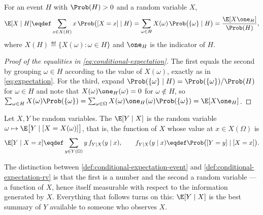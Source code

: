 \begin{definition}\label{def:conditional-expectation-event}
	For an event $H$ with $\Prob(H)>0$ and a random variable $X$,
	\begin{equation}\label{eq:conditional-expectation}
		\E[X\mid H]\eqdef\sum_{x\in X(H)}x\,\Prob\bigl([X=x]\mid H\bigr)
		=\sum_{\omega\in H}X(\omega)\,\Prob\bigl(\{\omega\}\mid H\bigr)
		=\frac{\E[X\one_H]}{\Prob(H)},
	\end{equation}
	where $X(H)\eqdef\{X(\omega) : \omega\in H\}$ and $\one_H$ is the indicator of
	$H$.
\end{definition}

\begin{proof}[Proof of the equalities in \eqref{eq:conditional-expectation}]
	The first equals the second by grouping $\omega\in H$ according to the value of
	$X(\omega)$, exactly as in \eqref{eq:expectation}. For the third, expand
	$\Prob(\{\omega\}\mid H)=\Prob(\{\omega\})/\Prob(H)$ for $\omega\in H$ and
	note that $X(\omega)\one_H(\omega)=0$ for $\omega\notin H$, so
	$\sum_{\omega\in H}X(\omega)\Prob(\{\omega\})
		=\sum_{\omega\in\Omega}X(\omega)\one_H(\omega)\Prob(\{\omega\})=\E[X\one_H]$.
\end{proof}

\begin{definition}
	\label{def:conditional-expectation-rv}
	Let $X,Y$ be random variables. The  $\E[Y\mid X]$ is the random variable
	$\omega\mapsto\E\bigl[Y\mid[X=X(\omega)]\bigr]$, that is, the function of $X$
	whose value at $x\in X(\Omega)$ is
	\begin{equation}\label{eq:conditional-expectation-rv}
		\E[Y\mid X=x]\eqdef\sum_{y\in Y(\Omega)}y\,f_{Y\mid X}(y\mid x),
		\qquad
		f_{Y\mid X}(y\mid x)\eqdef\Prob\bigl([Y=y]\mid[X=x]\bigr).
	\end{equation}
\end{definition}

The distinction between \autoref{def:conditional-expectation-event} and
\autoref{def:conditional-expectation-rv} is that the first is a number and the
second a random variable --- a function of $X$, hence itself measurable with
respect to the information generated by $X$. Everything that follows turns on
this: $\E[Y\mid X]$ is the best summary of $Y$ available to someone who
observes $X$.

